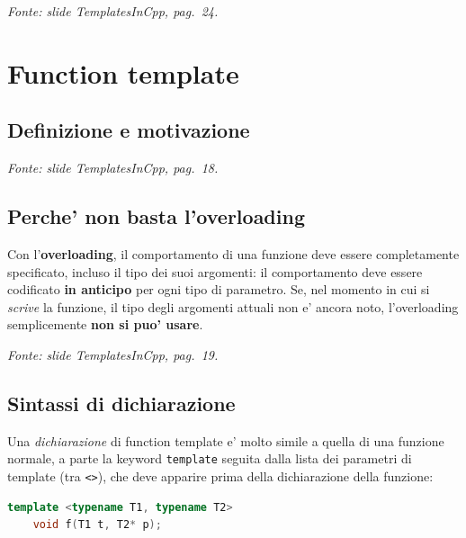 \documentclass{report}
\newcommand{\code}[1]{\texttt{\small #1}}
\newcommand{\fonteslide}[1]{{\footnotesize\itshape\color{gray} Fonte: slide \emph{TemplatesInCpp}, pag.~#1.\par}}
\begin{document}
\fonteslide{24}

\chapter{Function template}\label{ch:function}

\section{Definizione e motivazione}


\fonteslide{18}

\section{Perche' non basta l'overloading}

Con l'\textbf{overloading}, il comportamento di una funzione deve essere
completamente specificato, incluso il tipo dei suoi argomenti: il
comportamento deve essere codificato \textbf{in anticipo} per ogni tipo di
parametro. Se, nel momento in cui si \emph{scrive} la funzione, il tipo degli
argomenti attuali non e' ancora noto, l'overloading semplicemente \textbf{non
si puo' usare}.

\fonteslide{19}

\section{Sintassi di dichiarazione}

Una \emph{dichiarazione} di function template e' molto simile a quella di
una funzione normale, a parte la keyword \code{template} seguita dalla lista
dei parametri di template (tra \code{<>}), che deve apparire prima della
dichiarazione della funzione:

\begin{lstlisting}[language=C++]
template <typename T1, typename T2>
    void f(T1 t, T2* p);
\end{lstlisting}
\end{document}
